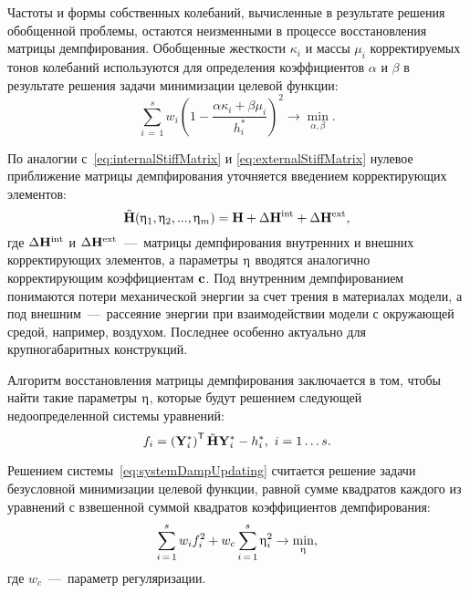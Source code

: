 Частоты и формы собственных колебаний, вычисленные в результате решения обобщенной проблемы, остаются неизменными в процессе восстановления матрицы демпфирования. Обобщенные жесткости $ \kappa_i $ и массы $ \mu_i $ корректируемых тонов колебаний используются для определения коэффициентов $ \alpha $ и $ \beta $ в результате решения задачи минимизации целевой функции:
\begin{equation}
	\sum \limits_{i\,=\,1} ^ s w_i \left( 1 - \frac{\alpha \kappa_i + \beta \mu_i}{h_i ^ \ast} \right)^2 \rightarrow \min_{\alpha, \beta}.
\end{equation}

По аналогии с~\eqref{eq:internalStiffMatrix} и \eqref{eq:externalStiffMatrix} нулевое приближение матрицы демпфирования уточняется введением корректирующих элементов:
\begin{equation}
	\tilde{\mathbf{H}}(\upeta_1, \upeta_2, ..., \upeta_m) = \mathbf{H} + \Delta \mathbf{H} ^ {\text{int}} + \Delta \mathbf{H} ^ {\text{ext}},
\end{equation}
где $ \Delta \mathbf{H} ^ {\text{int}} $ и $ \Delta \mathbf{H} ^ {\text{ext}} $~---~матрицы демпфирования внутренних и внешних корректирующих элементов, а параметры $ \mathbf{\upeta} $ вводятся аналогично корректирующим коэффициентам $ \mathbf{c} $. Под внутренним демпфированием понимаются потери механической энергии за счет трения в материалах модели, а под внешним~---~рассеяние энергии при взаимодействии модели с окружающей средой, например, воздухом. Последнее особенно актуально для крупногабаритных конструкций.

Алгоритм восстановления матрицы демпфирования заключается в том, чтобы найти такие параметры $ \mathbf{\upeta} $, которые будут решением следующей недоопределенной системы уравнений:
\begin{equation}
	f_i = \left( \mathbf{Y}_i ^ \ast \right) ^ \mathsf{T} \tilde{\mathbf{H}} \mathbf{Y}_i ^ \ast - h_i ^ \ast, \ i = 1 \hdots s. \label{eq:systemDampUpdating}
\end{equation}

Решением системы~\eqref{eq:systemDampUpdating} считается решение задачи безусловной минимизации целевой функции, равной сумме квадратов каждого из уравнений с взвешенной суммой квадратов коэффициентов демпфирования:
\begin{equation}
	\sum \limits_{i\,=\,1} ^ s w_i f_i ^ 2 + w_c \sum \limits_{i\,=\,1}^s \upeta_i ^ 2 \rightarrow \min_{\mathbf{\upeta}},
	\label{eq:objFinalDampFunUpdating}
\end{equation}
где $ w_c $~---~параметр регуляризации.

